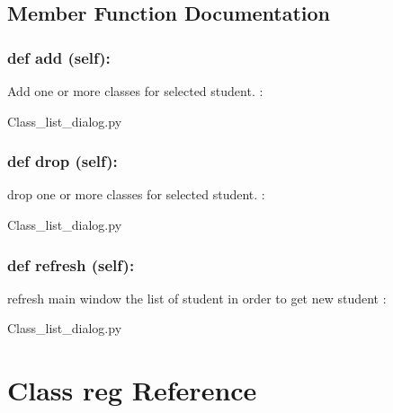 \subsection{Member Function Documentation}
\hypertarget{class_poly_a14a7ad77ce612b0c54f531d307ee4b39}{
\subsubsection[{def add (self):}]{\setlength{\rightskip}{0pt plus 5cm}def {add} (self):}}\label{class_poly_a14a7ad77ce612b0c54f531d307ee4b39}
Add one or more classes for selected student.
:\begin{DoxyCompactItemize}
\item 
Class\_list\_dialog.\-py\end{DoxyCompactItemize}

\hypertarget{class_poly_a14a7ad77ce612b0c54f531d307ee4b39}{
\subsubsection[{def drop (self):}]{\setlength{\rightskip}{0pt plus 5cm}def {drop} (self):}}\label{class_poly_a14a7ad77ce612b0c54f531d307ee4b39}
drop one or more classes for selected student.
:\begin{DoxyCompactItemize}
\item 
Class\_list\_dialog.\-py\end{DoxyCompactItemize}

\hypertarget{class_poly_a14a7ad77ce612b0c54f531d307ee4b39}{
\subsubsection[{def refresh (self):}]{\setlength{\rightskip}{0pt plus 5cm}def {refresh} (self):}}\label{class_poly_a14a7ad77ce612b0c54f531d307ee4b39}
refresh main window the list of student in order to get new student
:\begin{DoxyCompactItemize}
\item 
Class\_list\_dialog.\-py\end{DoxyCompactItemize}

\hypertarget{Class_reg}{\section{Class reg Reference}
\label{Class_reg}
}
